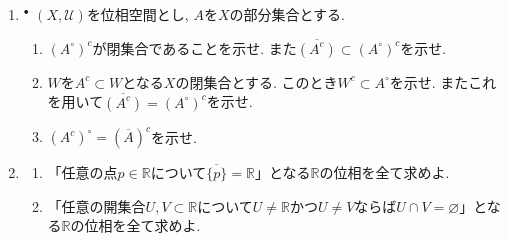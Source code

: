 \documentclass[dvipdfmx,a4paper,11pt]{article}
\newcommand{\R}{\mathbb{R}}
\newcommand{\Q}{\mathbb{Q}}
\theoremstyle{definition}
\begin{document}
\begin{enumerate}[label=\textbf{問}\ref*{sec-subspace}.\arabic*]
\item $^\bullet$ $(X, \mathscr{U})$を位相空間とし, $A$を$X$の部分集合とする. 
\begin{enumerate}
\setlength{\parskip}{0cm} 
  \setlength{\itemsep}{0cm} 
\item $(A^{\circ})^{c}$が閉集合であることを示せ. また$\overline{(A^c)} \subset  (A^{\circ})^c$を示せ.
\item $W$を$A^c \subset W$となる$X$の閉集合とする. このとき$W^c \subset A^{\circ}$を示せ. またこれを用いて$\overline{(A^c)} =  (A^{\circ})^c$を示せ. 
\item $(A^c)^{\circ}= (\overline{A})^c$を示せ.
\end{enumerate}





\item 
\begin{enumerate}
	\setlength{\parskip}{0cm}
  \setlength{\itemsep}{0pt} 
	\item  「任意の点$p \in \R$について$\overline{\{p\}} =\R$」となる$\R$の位相を全て求めよ. 
	\item  「任意の開集合$U,V \subset \R$について$U \neq \R$かつ$U \neq V$ならば$U \cap V = \varnothing$」となる$\R$の位相を全て求めよ. 
	\end{enumerate}
	



\end{enumerate}
\end{document}
